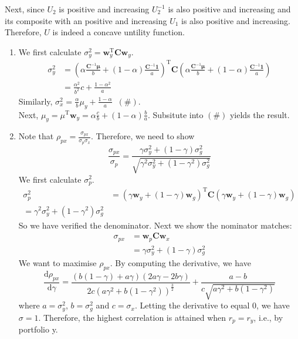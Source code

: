 \documentclass[12pt]{article}
\newcommand{\diff}{\mathrm{d}}
\theoremstyle{definition}
\begin{document}
\begin{enumerate}
\begin{enumerate}
\begin{enumerate}
Next, since $U_2$ is positive and increasing $U_2^{-1}$ is also positive and increasing and its composite with an positive and increasing $U_1$ is also positive and increasing.\\
Therefore, $U$ is indeed a concave untility function.
\end{enumerate}
\end{enumerate}
\begin{enumerate}
  \item We first calculate $\sigma_y^2 = \mathbf{w}_y^\text{T}\mathbf{C}\mathbf{w}_y$.
  \begin{align*}
  \sigma_y^2&=(\alpha\frac{\mathbf{C}^{-1}\mathbf{\mu}}{b}+(1-\alpha)\frac{\mathbf{C}^{-1}\mathbf{1}}{a})^\text{T}\mathbf{C}(\alpha\frac{\mathbf{C}^{-1}\mathbf{\mu}}{b}+(1-\alpha)\frac{\mathbf{C}^{-1}\mathbf{1}}{a})\\
  &=\frac{\alpha^2}{b^2}c+\frac{1-\alpha^2}{a}
  \end{align*}
  Similarly, $\sigma_x^2 = \frac{\alpha}{b}\mu_y+\frac{1-\alpha}{a}\;\;(\#)$.\\
  Next, $\mu_y = \mu^\text{T}\mathbf{w}_y = \alpha\frac{c}{b}+(1-\alpha)\frac{b}{a}$. Subsitute into $(\#)$ yields the result.
  \item Note that $\rho_{px}=\frac{\sigma_{px}}{\sigma_p\sigma_x}$. Therefore, we need to show
  \[\frac{\sigma_{px}}{\sigma_p}=\frac{\gamma \sigma_y^2+(1-\gamma)\sigma_g^2}{\sqrt{\gamma^2\sigma_y^2+(1-\gamma^2)\sigma_g^2}}
  \]
  We first calculate $\sigma_p^2$.
  \begin{align*}
  \sigma_p^2&=(\gamma\mathbf{w}_y+(1-\gamma)\mathbf{w}_g)^\text{T}\mathbf{C}(\gamma\mathbf{w}_y+(1-\gamma)\mathbf{w}_g)\\
  =\gamma^2\sigma_y^2+(1-\gamma^2)\sigma_g^2
  \end{align*}
  So we have verified the denominator. Next we show the nominator matches:
  \begin{align*}
  \sigma_{px}&=\mathbf{w}_p\mathbf{C}\mathbf{w}_x\\
  &=\gamma\sigma^2_y+(1-\gamma)\sigma_g^2
  \end{align*}
  We want to maximise $\rho_{px}$. By computing the derivative, we have
  \[
\frac{\diff \rho_{px}}{\diff \gamma}=\frac{(b(1-\gamma)+a\gamma)(2a\gamma-2b\gamma)}{2c(a\gamma^2+b(1-\gamma^2))^\frac{3}{2}}+\frac{a-b}{c\sqrt{a\gamma^2+b(1-\gamma^2)}}
  \]
where $a=\sigma_y^2$, $b=\sigma_g^2$ and $c=\sigma_x$.
Letting the derivative to equal 0, we have $\sigma = 1$. Therefore, the highest correlation is attained when $r_p=r_y$, i.e., by portfolio y.

\end{enumerate}
\end{enumerate}
\end{document}
